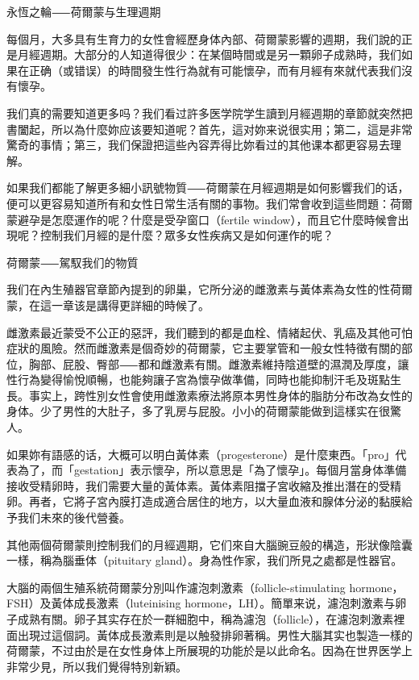 \documentclass[12pt,UTF8]{ctexbook}
\begin{document}
永恆之輪⸺荷爾蒙与生理週期




每個月，大多具有生育力的女性會經歷身体內部、荷爾蒙影響的週期，我们說的正是月經週期。大部分的人知道得很少：在某個時間或是另一顆卵子成熟時，我们如果在正确（或错误）的時間發生性行為就有可能懷孕，而有月經有來就代表我们沒有懷孕。

我们真的需要知道更多吗？我们看过許多医学院学生讀到月經週期的章節就突然把書闔起，所以為什麼妳应该要知道呢？首先，這对妳来说很实用；第二，這是非常驚奇的事情；第三，我们保證把這些內容弄得比妳看过的其他课本都更容易去理解。

如果我们都能了解更多細小訊號物質⸺荷爾蒙在月經週期是如何影響我们的话，便可以更容易知道所有和女性日常生活有關的事物。我们常會收到這些問題：荷爾蒙避孕是怎麼運作的呢？什麼是受孕窗口（fertile window），而且它什麼時候會出現呢？控制我们月經的是什麼？眾多女性疾病又是如何運作的呢？





荷爾蒙⸺駕馭我们的物質




我们在內生殖器官章節內提到的卵巢，它所分泌的雌激素与黃体素為女性的性荷爾蒙，在這一章该是講得更詳細的時候了。

雌激素最近蒙受不公正的惡評，我们聽到的都是血栓、情緒起伏、乳癌及其他可怕症狀的風險。然而雌激素是個奇妙的荷爾蒙，它主要掌管和一般女性特徵有關的部位，胸部、屁股、臀部⸺都和雌激素有關。雌激素維持陰道壁的濕潤及厚度，讓性行為變得愉悅順暢，也能夠讓子宮為懷孕做準備，同時也能抑制汗毛及斑點生長。事实上，跨性別女性會使用雌激素療法將原本男性身体的脂肪分布改為女性的身体。少了男性的大肚子，多了乳房与屁股。小小的荷爾蒙能做到這樣实在很驚人。

如果妳有語感的话，大概可以明白黃体素（progesterone）是什麼東西。「pro」代表為了，而「gestation」表示懷孕，所以意思是「為了懷孕」。每個月當身体準備接收受精卵時，我们需要大量的黃体素。黃体素阻擋子宮收縮及推出潛在的受精卵。再者，它將子宮內膜打造成適合居住的地方，以大量血液和腺体分泌的黏膜給予我们未來的後代營養。

其他兩個荷爾蒙則控制我们的月經週期，它们來自大腦豌豆般的構造，形狀像陰囊一樣，稱為腦垂体（pituitary gland）。身為性作家，我们所見之處都是性器官。

大腦的兩個生殖系統荷爾蒙分別叫作濾泡刺激素（follicle-stimulating hormone，FSH）及黃体成長激素（luteinising hormone，LH）。簡單来说，濾泡刺激素与卵子成熟有關。卵子其实存在於一群細胞中，稱為濾泡（follicle），在濾泡刺激素裡面出現过這個詞。黃体成長激素則是以触發排卵著稱。男性大腦其实也製造一樣的荷爾蒙，不过由於是在女性身体上所展現的功能於是以此命名。因為在世界医学上非常少見，所以我们覺得特別新穎。
\end{document}
